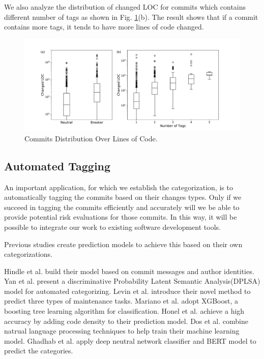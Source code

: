 We also analyze the distribution of changed LOC for commits which contains different number of tags as shown in Fig. \ref{fig: commit_LOC}(b).
The result shows that if a commit contains more tags, it tends to have more lines of code changed. 
\begin{figure}[htbp]
\centerline{\includegraphics[scale=0.5]{figures/commit_size.pdf}}
\caption{Commits Distribution Over Lines of Code.}
\label{fig: commit_LOC}
\end{figure}

\subsection{Automated Tagging}
An important application, for which we establish the categorization, is to automatically tagging the commits based on their changes types.
Only if we succeed in tagging the commits efficiently and accurately will we be able to provide potential risk evaluations for those commits. 
In this way, it will be possible to integrate our work to existing software development tools.

Previous studies create prediction models to achieve this based on their own categorizations.

Hindle et al. \cite{Hindle_auto} build their model based on commit messages and author identities.
Yan et al. \cite{yan2016automatically} present a discriminative Probability Latent Semantic Analysis(DPLSA) model for automated categorizing. 
Levin et al. \cite{levin2017boosting} introduce their novel method to predict three types of maintenance tasks. 
Mariano et al. \cite{mariano2019feature} adopt XGBoost, a boosting tree learning algorithm for classification.
Honel et al. \cite{honel2019importance} achieve a high accuracy by adding code density to their prediction model.
Dos et al. \cite{dos2020commit} combine natrual language processing techniques to help train their machine learning model.
Ghadhab et al. \cite{ghadhab2021augmenting} apply deep neutral network classifier and BERT model to predict the categories.

